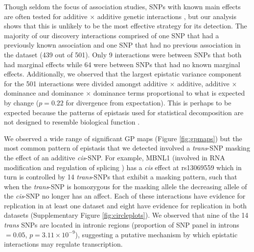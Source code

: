 \documentclass{article}
\begin{document}
Though seldom the focus of association studies, SNPs with known main effects are often tested for additive $\times$ additive genetic interactions \cite{Cordell2009}, but our analysis shows that this is unlikely to be the most effective strategy for its detection. The majority of our discovery interactions comprised of one SNP that had a previously known association and one SNP that had no previous association in the dataset \cite{Powell2013} (439 out of 501). Only 9 interactions were between SNPs that both had marginal effects while 64 were between SNPs that had no known marginal effects. Additionally, we observed that the largest epistatic variance component for the 501 interactions were divided amongst additive $\times$ additive, additive $\times$ dominance and dominance $\times$ dominance terms proportional to what is expected by change ($p = 0.22$ for divergence from expectation). This is perhaps to be expected because the patterns of epistasis used for statistical decomposition are not designed to resemble biological function \cite{Cockerham1954}.

We observed a wide range of significant GP maps (Figure \ref{fig:gpmaps}) but the most common pattern of epistasis that we detected involved a \emph{trans}-SNP masking the effect of an additive \emph{cis}-SNP. For example, MBNL1 (involved in RNA modification and regulation of splicing \cite{Ho2004}) has a \emph{cis} effect at rs13069559 which in turn is controlled by 14 \emph{trans}-SNPs that exhibit a masking pattern, such that when the \emph{trans}-SNP is homozygous for the masking allele the decreasing allele of the \emph{cis}-SNP no longer has an affect. Each of these interactions have evidence for replication in at least one dataset and eight have evidence for replication in both datasets (Supplementary Figure \ref{fig:circleplots}). We observed that nine of the 14 \emph{trans} SNPs are located in intronic regions (proportion of SNP panel in introns $= 0.05$, $p = 3.11 \times 10^{-9}$), suggesting a putative mechanism by which epistatic interactions may regulate transcription.
\end{document}
